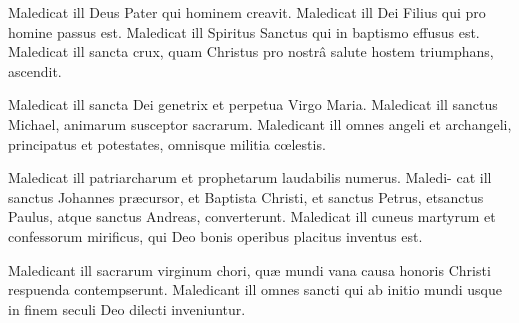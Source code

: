 \documentclass{article}
\begin{document}
Maledicat ill Deus Pater qui homi\-nem creavit. Maledicat
ill Dei Filius qui pro homine passus est.  Maledicat ill
Spiritus Sanctus qui in baptismo effusus est.  Maledicat ill sancta
crux, quam Christus pro nostrâ salute hostem triumphans, ascendit.

Maledicat ill sancta Dei genetrix et perpetua Virgo Maria. Maledicat ill sanctus
Michael, animarum susceptor sa\-crarum. Maledicant ill omnes angeli et archangeli,
principatus et potestates, omnisque militia cœlestis.


\newpage
\noindent
{}

\noindent
{}
\stick{\lqq curse him.” [Our armies swore ter-}
\stick{dog so.]\hfill}

\newpage
Maledicat ill patriarcharum et pro\-phetarum laudabilis numerus.
Maledi-\break
cat ill
sanctus Johannes præcursor, et Baptista Christi, et sanctus Petrus, et\break sanctus
Paulus, atque sanctus Andreas, 
converterunt. Maledicat ill cuneus martyrum et confessorum mirificus, qui Deo bonis operibus
placitus inventus est.

Maledicant ill sacrarum virginum chori, quæ mundi vana causa honoris Christi
respuenda contempserunt. Male\-dicant ill omnes sancti qui ab initio mundi usque in
finem seculi Deo dilecti inveniuntur.
\end{document}

